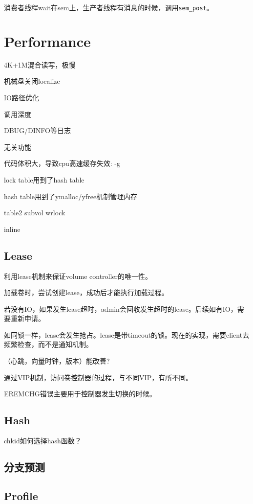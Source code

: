 消费者线程wait在sem上，生产者线程有消息的时候，调用\verb|sem_post|。

\section{Performance}

4K+1M混合读写，极慢

机械盘关闭localize

IO路径优化
\begin{enumbox}
\item 调用深度
\item DBUG/DINFO等日志
\item 无关功能
\item 代码体积大，导致cpu高速缓存失效: -g
\item lock table用到了hash table
\item hash table用到了ymalloc/yfree机制管理内存
\item table2 subvol wrlock
\item inline
\end{enumbox}

\subsection{Lease}

利用lease机制来保证volume controller的唯一性。

加载卷时，尝试创建lease，成功后才能执行加载过程。

若没有IO，如果发生lease超时，admin会回收发生超时的lease。后续如有IO，需要重新申请。

如同锁一样，lease会发生抢占。lease是带timeout的锁。现在的实现，需要client去频繁检查，而不是通知机制。

（心跳，向量时钟，版本）能改善?

通过VIP机制，访问卷控制器的过程，与不同VIP，有所不同。

EREMCHG错误主要用于控制器发生切换的时候。

\subsection{Hash}

chkid如何选择hash函数？

\subsection{分支预测}

\subsection{Profile}

